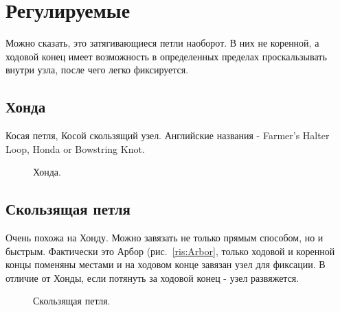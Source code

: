 \section{Регулируемые}

Можно сказать, это затягивающиеся петли наоборот. В них не коренной, а ходовой конец имеет возможность в определенных пределах проскальзывать внутри узла, после чего легко фиксируется.

\subsection{Хонда}

Косая петля, Косой скользящий узел. Английские названия - Farmer’s Halter Loop, Honda or Bowstring Knot.


\begin{figure}[H]\centering
	\begin{minipage}{1\linewidth}
		\begin{center}
			\tcbox[enhanced jigsaw,colframe=black,opacityframe=0.5,opacityback=0.5]
			{\centering{}}
		\end{center}
	\end{minipage}
\caption{Хонда.}
\label{ris:Honda}
\end{figure}

\subsection{Скользящая петля}

Очень похожа на Хонду. Можно завязать не только прямым способом, но и быстрым. Фактически это Арбор (рис.~\ref{ris:Arbor}, только ходовой и коренной концы поменяны местами и на ходовом конце завязан узел для фиксации. В отличие от Хонды, если потянуть за ходовой конец - узел развяжется.

\begin{figure}[H]\centering
	\begin{minipage}{1\linewidth}
		\begin{center}
			\tcbox[enhanced jigsaw,colframe=black,opacityframe=0.5,opacityback=0.5]
			{\centering{}}
		\end{center}
	\end{minipage}
\caption{Скользящая петля.}
\label{ris:Honda_2}
\end{figure}

